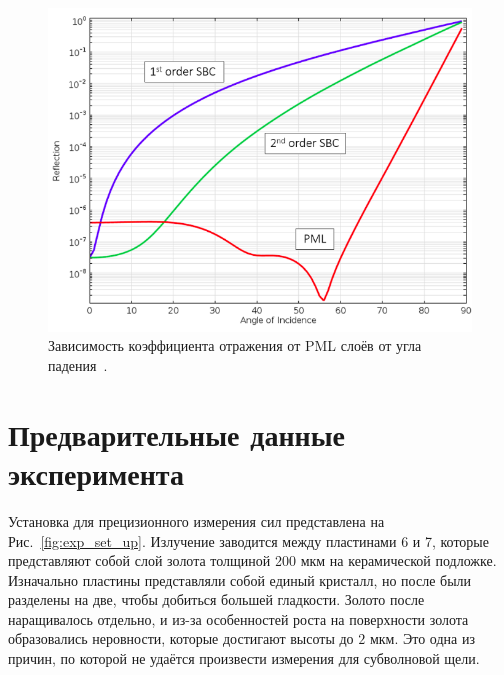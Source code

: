 \begin{figure}
    \centering
    \includegraphics[width = \textwidth]{figures/PML_refl.png}
    \caption{Зависимость коэффициента отражения от PML слоёв от угла падения~\cite{Refl_PML}.}
    \label{fig:PML_angle_dep}
\end{figure}
\chapter{Предварительные данные эксперимента}
Установка для прецизионного измерения сил представлена на Рис.~\ref{fig:exp_set_up}. Излучение заводится между пластинами 6 и 7, которые представляют собой слой золота толщиной 200 мкм на керамической подложке. Изначально пластины представляли собой единый кристалл, но после были разделены на две, чтобы добиться большей гладкости. Золото после наращивалось отдельно, и из-за особенностей роста на поверхности золота образовались неровности, которые достигают высоты до $2$ мкм. Это одна из причин, по которой не удаётся произвести измерения для субволновой щели.

